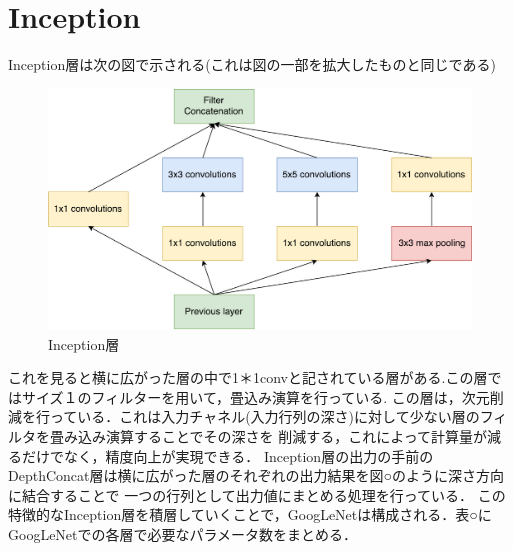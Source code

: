 {\section{Inception}
\label{sec:inception}
Inception層は次の図で示される(これは図の一部を拡大したものと同じである)
\begin{figure}[h]
  \centering
  \includegraphics[scale=0.5]{./chap2/fig/inception.pdf}
  \caption{Inception層}
  \label{fig:inception}
\end{figure}
これを見ると横に広がった層の中で1＊1convと記されている層がある.この層ではサイズ１のフィルターを用いて，畳込み演算を行っている.
この層は，次元削減を行っている．これは入力チャネル(入力行列の深さ)に対して少ない層のフィルタを畳み込み演算することでその深さを
削減する，これによって計算量が減るだけでなく，精度向上が実現できる．
Inception層の出力の手前のDepthConcat層は横に広がった層のそれぞれの出力結果を図○のように深さ方向に結合することで
一つの行列として出力値にまとめる処理を行っている．
この特徴的なInception層を積層していくことで，GoogLeNetは構成される．表○にGoogLeNetでの各層で必要なパラメータ数をまとめる．

}
